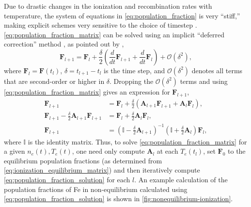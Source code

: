 Due to drastic changes in the ionization and recombination rates with temperature, the system of equations in \autoref{eq:population_fraction} is very ``stiff,'' making explicit schemes very sensitive to the choice of timestep \citep{macneice_numerical_1984,bradshaw_numerical_2009}. \autoref{eq:population_fraction_matrix} can be solved using an implicit ``deferred correction'' method \citep{npl_modern_1961}, as pointed out by \citet{macneice_numerical_1984},
\begin{equation}\label{eq:deferred_correction}
    \mathbf{F}_{l+1} = \mathbf{F}_{l} + \frac{\delta}{2}\left(\frac{d}{dt}\mathbf{F}_{l+1} + \frac{d}{dt}\mathbf{F}_l\right) + \mathcal{O}(\delta^2),
\end{equation}
where $\mathbf{F}_l=\mathbf{F}(t_l)$, $\delta = t_{l+1} - t_l$ is the time step, and $\mathcal{O}(\delta^2)$ denotes all terms that are second-order or higher in $\delta$. Dropping the $\mathcal{O}(\delta^2)$ terms and using \autoref{eq:population_fraction_matrix} gives an expression for $\mathbf{F}_{l+1}$,
\begin{align}\label{eq:population_fraction_solution}
    \mathbf{F}_{l+1} &= \mathbf{F}_{l} + \frac{\delta}{2}\left(\mathbf{A}_{l+1}\mathbf{F}_{l+1} + \mathbf{A}_l\mathbf{F}_l\right), \nonumber \\
    \mathbf{F}_{l+1} - \frac{\delta}{2}\mathbf{A}_{l+1}\mathbf{F}_{l+1} &= \mathbf{F}_{l} + \frac{\delta}{2}\mathbf{A}_l\mathbf{F}_l, \nonumber \\
    \mathbf{F}_{l+1} &= \left(\mathbb{I} - \frac{\delta}{2}\mathbf{A}_{l+1}\right)^{-1}\left(\mathbb{I} + \frac{\delta}{2}\mathbf{A}_l\right)\mathbf{F}_l,
\end{align}
where $\mathbb{I}$ is the identity matrix. Thus, to solve \autoref{eq:population_fraction_matrix} for a given $n_e(t),T_e(t)$, one need only compute $\mathbf{A}_l$ at each $T_e(t_l)$, set $\mathbf{F}_0$ to the equilibrium population fractions (as determined from \autoref{eq:ionization_equilibrium_matrix}) and then iteratively compute \autoref{eq:population_fraction_solution} for each $l$. An example calculation of the population fractions of Fe in non-equilibrium calculated using \autoref{eq:population_fraction_solution} is shown in \autoref{fig:nonequilibrium-ionization}.

